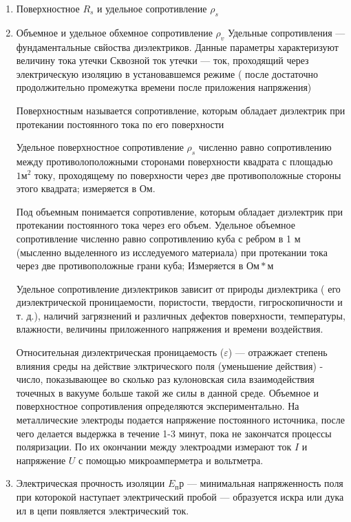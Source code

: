 \documentclass{article}
\begin{document}
\begin{enumerate}
	\item Поверхностное $R_s$ и удельное сопротивление $\rho_s$
	\item Объемное и удельное обхемное сопротивление $\rho_v$
Удельные сопротивления --- фундаментальные свйоства диэлектриков. Данные параметры характеризуют величину тока утечки
Сквозной ток утечки --- ток, проходящий через электрическую изоляцию в установавшемся режиме ( после достаточно продолжительно промежутка времени после приложения напряжения)

Поверхностным называется сопротивление, которым обладает диэлектрик при протекании постоянного тока по его поверхности

Удельное поверхностное сопротивление $\rho_s$ численно равно сопротивлению между противолоположными сторонами поверхности квадрата с площадью $1 м^2$ току, проходящему по поверхности через две противоположные стороны этого квадрата; измеряется в Ом.

Под объемным понимается сопротивление, которым обладает диэлектрик при протекании постоянного тока через его объем.
Удельное объемное сопротивление численно равно сопротивлению куба с ребром в 1 м (мысленно выделенного из исследуемого материала) при протекании тока через две противоположные грани куба; Измеряется в $Ом * м$

Удельное сопротивление диэлектриков зависит от природы диэлектрика ( его диэлектрической проницаемости, пористости, твердости, гигроскопичности и т. д.), наличий загрязнений и различных дефектов поверхности, температуры, влажности, величины приложенного напряжения и времени воздействия.

Относительная диэлектрическая проницаемость ($\varepsilon$) --- отражжает степень влияния среды на действие элктрического поля (уменьшение действия) - число, показывающее во сколько раз кулоновская сила взаимодействия точечных в вакууме больше такой же силы в данной среде.
Объемное и поверхностное сопротивления определяются экспериментально.
На металлические электроды подается напряжение постоянного источника, после чего делается выдержка в течение 1-3 минут, пока не закончатся процессы поляризации. По их окончании между электроадми измерают ток $I$ и напряжение $U$ с помощью микроамперметра и вольтметра.

	\item Электрическая прочность изоляции $E_пр$ --- минимальная напряженность поля при которокой наступает электрический пробой --- образуется искра или дука ил в цепи появляется электрический ток.


\end{enumerate}
\end{document}
